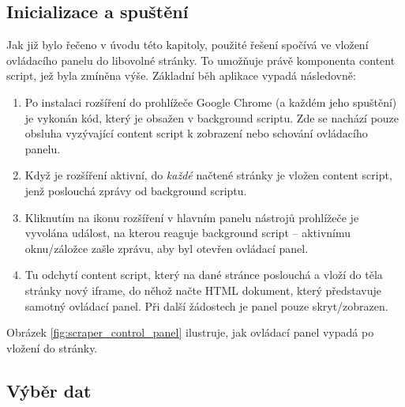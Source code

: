 \documentclass[thesis=B,czech]{FITthesis2}[2012/06/26]
\begin{document}
	\subsection{Inicializace a spuštění}
	Jak již bylo řečeno v úvodu této kapitoly, použité řešení spočívá ve vložení ovládacího panelu do libovolné stránky. To umožňuje právě komponenta content script, jež byla zmíněna výše. Základní běh aplikace vypadá následovně:
	\begin{enumerate}
		\item Po instalaci rozšíření do prohlížeče Google Chrome (a každém jeho spuštění) je vykonán kód, který je obsažen v background scriptu. Zde se nachází pouze obsluha vyzývající content script k zobrazení nebo schování ovládacího panelu.
		\item Když je rozšíření aktivní, do \emph{každé} načtené stránky je vložen content script, jenž poslouchá zprávy od background scriptu.
		\item Kliknutím na ikonu rozšíření v hlavním panelu nástrojů prohlížeče je vyvolána událost, na kterou reaguje background script -- aktivnímu oknu/záložce zašle zprávu, aby byl otevřen ovládací panel. 
		\item Tu odchytí content script, který na dané stránce poslouchá a vloží do těla stránky nový iframe, do něhož načte HTML dokument, který představuje samotný ovládací panel. Při další žádostech je panel pouze skryt/zobrazen.
	\end{enumerate}
	Obrázek \ref{fig:scraper_control_panel} ilustruje, jak ovládací panel vypadá po vložení do stránky.
	

	\subsection{Výběr dat}
	
	
	
	\begin{conclusion}
	\end{conclusion}
	
	
	
\end{document}
